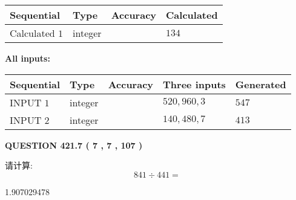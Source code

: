\documentclass{ctexart}
\begin{document}
   
   
   
\noindent{}
   
   
  
  
\noindent\begin{tabular}{|l|l|l|l|}
\hline
 Sequential & Type & Accuracy & Calculated \\ 
\hline
 
 
  Calculated $  1 $ & integer &  & 
  $ 134 $ 
 \\  \hline  
 \end{tabular}
   
   
   
   
\noindent\vspace{0.1in}\hspace{-0.08in} {\textbf{\Large{All inputs: }}}
   
   
  
  
\noindent\begin{tabular}{|l|l|l|l|l|}
\hline
 Sequential & Type & Accuracy & Three inputs & Generated \\ 
\hline
 
 
  INPUT $  1 $ & integer &  & $
 520
 , 
 960
 , 
 3
 $ & $ 547 $ 
 \\  \hline  
 
 
  INPUT $  2 $ & integer &  & $
 140
 , 
 480
 , 
 7
 $ & $ 413 $ 
 \\  \hline  
 \end{tabular}
   
   
  
\vspace{0.2in}
  
{\textbf{\Large{QUESTION
421.7 
 ( 7 , 7 , 107 )
}}}
  
  
 
请计算:
\begin{equation}
841  \div    %
441 = \nonumber
\end{equation}
 
 
 
\noindent{}
 
 

1.907029478
 
 
\noindent{}
 
 

 
 
 
\noindent{}
 
\end{document}
